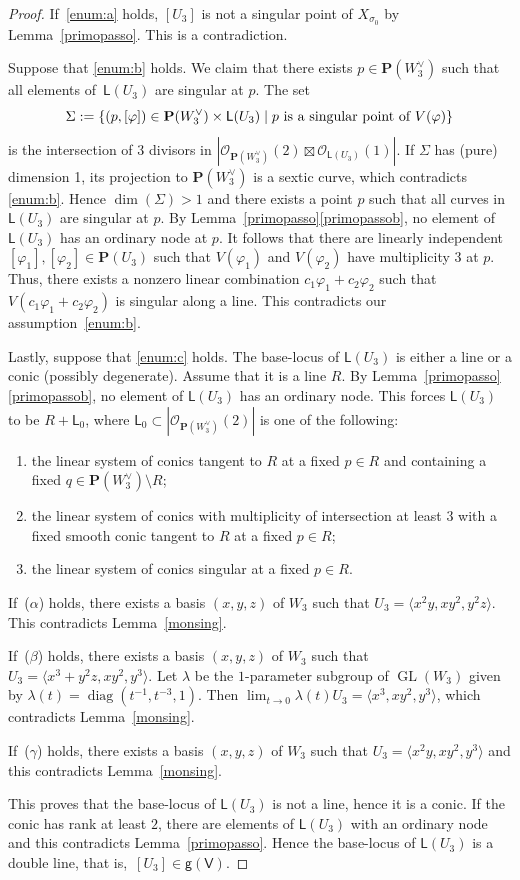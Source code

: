 \documentclass[JEP,XML,SOM,Unicode, NoEqCountersInSection,NoFloatCountersInSection]{cedram}
\let\mathcal\mathscr
\theoremstyle{definition}
\renewcommand\P{{\mathbf P}}\let\PP\P
\newcommand\cO{\mathcal{O}}\let\OO\cO
\newcommand\sfg{\mathsf{g}}
\newcommand\sfL{\mathsf{L}}
\newcommand\sfV{\mathsf{V}}
\newcommand\gv{\sfg(\sfV)}
\let\phi\varphi
\let\la\langle
\let\ra\rangle
\DeclareMathOperator{\GL}{GL}
\DeclareMathOperator{\diag}{diag}
\begin{document}
\begin{proof}
If~\eqref{enum:a} holds, $[U_3]$ is not a singular point of $X_{\sigma_0}$ by Lemma~\ref{primopasso}. This is a contradiction.

Suppose that \eqref{enum:b} holds. We claim that there exists $p\in\PP(W_3^{\vee})$ such that all elements of~$\sfL(U_3)$ are singular at $p$. The set
\[
\Sigma:=\{(p,[\phi])\in \PP(W_3^{\vee})\times\sfL(U_3) \mid \textnormal{$p$ is a singular point of $V(\phi)$}\}
\]
is the intersection of $3$ divisors in $|\cO_{\PP(W_3^{\vee})}(2)\boxtimes\cO_{\sfL(U_3)}(1)|$. If $\Sigma$ has (pure) dimension 1, its projection to $\PP(W_3^{\vee})$ is a sextic curve, which contradicts \eqref{enum:b}. Hence $\dim(\Sigma)>1$ and there exists a point $p$ such that all curves in $\sfL(U_3)$ are singular at $p$. By Lemma~\ref{primopasso}\eqref{primopassob}, no element of $\sfL(U_3)$ has an ordinary node at $p$. It follows that there are linearly independent $[\phi_1],[\phi_2]\in\PP(U_3)$ such that $V(\phi_1)$ and $V(\phi_2)$ have multiplicity $3$ at $p$. Thus, there exists a nonzero linear combination $c_1\phi_1+c_2\phi_2$ such that
$V(c_1\phi_1+c_2\phi_2)$ is singular along a line. This contradicts our assumption~\eqref{enum:b}.

Lastly, suppose that \eqref{enum:c} holds. The base-locus of $\sfL(U_3)$ is either a line or a conic (possibly degenerate). Assume that it is a line $R$.
By Lemma~\ref{primopasso}\eqref{primopassob}, no element of $\sfL(U_3)$ has an ordinary node. This forces $\sfL(U_3)$ to be $R+\sfL_0$, where
$\sfL_0\subset |\cO_{\PP(W_3^{\vee})}(2)|$ is one of the following:
\begin{enumerate}
\item[($\alpha$)]
the linear system of conics tangent to $R$ at a fixed $p\in R$ and containing a fixed
$q\in \P(W_3^{\vee})\setminus R$;
\item[($\beta$)]
the linear system of conics with multiplicity of intersection at least $3$ with a fixed smooth conic tangent to $R$ at a fixed $p\in R$;
\item[($\gamma$)]
the linear system of conics singular at a fixed $p\in R$.
\end{enumerate}
If~($\alpha$) holds, there exists a basis $(x,y,z)$ of $W_3$ such that $U_3=\la x^2y,xy^2,y^2z\ra$. This contradicts
Lemma~\ref{monsing}.

If~($\beta$) holds, there exists a basis $(x,y,z)$ of $W_3$ such that $U_3=\la x^3+y^2z,xy^2,y^3\ra$. Let $\lambda$ be the $1$-parameter subgroup of $\GL(W_3)$ given by $\lambda(t)=\diag(t^{-1},t^{-3},1)$. Then $\lim_{t\to 0}\lambda(t) U_3=\la x^3,xy^2,y^3\ra$, which contradicts
Lemma~\ref{monsing}.

If~($\gamma$) holds, there exists a basis $(x,y,z)$ of $W_3$ such that $U_3=\la x^2y,xy^2,y^3\ra$ and this contradicts Lemma~\ref{monsing}.

This proves that the base-locus of $\sfL(U_3)$ is not a line, hence it is a conic. If the conic has rank at least $2$, there are elements of $\sfL(U_3)$ with an ordinary node and this contradicts Lemma~\ref{primopasso}. Hence the base-locus of $\sfL(U_3)$ is a double line, that is,~$[U_3]\in\gv$.
\end{proof}
\end{document}
